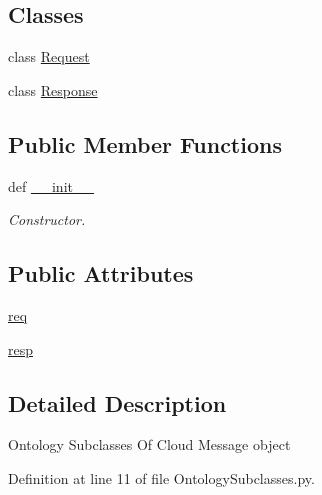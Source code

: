 \subsection*{Classes}
\begin{DoxyCompactItemize}
\item 
class \hyperlink{classRappCloud_1_1CloudMsgs_1_1OntologySubclasses_1_1OntologySubclasses_1_1Request}{Request}
\item 
class \hyperlink{classRappCloud_1_1CloudMsgs_1_1OntologySubclasses_1_1OntologySubclasses_1_1Response}{Response}
\end{DoxyCompactItemize}
\subsection*{Public Member Functions}
\begin{DoxyCompactItemize}
\item 
def \hyperlink{classRappCloud_1_1CloudMsgs_1_1OntologySubclasses_1_1OntologySubclasses_a6a2a28981a4b49ac4381792d22443180}{\-\_\-\-\_\-init\-\_\-\-\_\-}
\begin{DoxyCompactList}\small\item\em Constructor. \end{DoxyCompactList}\end{DoxyCompactItemize}
\subsection*{Public Attributes}
\begin{DoxyCompactItemize}
\item 
\hyperlink{classRappCloud_1_1CloudMsgs_1_1OntologySubclasses_1_1OntologySubclasses_a8205935d115fe247d3a28319afb187f6}{req}
\item 
\hyperlink{classRappCloud_1_1CloudMsgs_1_1OntologySubclasses_1_1OntologySubclasses_a6518b5b3e353a7592456987104b4a21e}{resp}
\end{DoxyCompactItemize}


\subsection{Detailed Description}
\begin{DoxyVerb}Ontology Subclasses Of Cloud Message object\end{DoxyVerb}
 

Definition at line 11 of file Ontology\-Subclasses.\-py.



